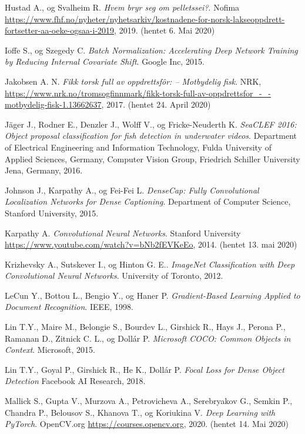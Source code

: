 \documentclass[11ot]{article}
\begin{document}
\begin{thebibliography}{9}
Hustad A., og Svalheim R.
\textit{Hvem bryr seg om pelletssei?}. 
Nofima \url{https://www.fhf.no/nyheter/nyhetsarkiv/kostnadene-for-norsk-lakseoppdrett-fortsetter-aa-oeke-ogsaa-i-2019}, 2019. (hentet 6. Mai 2020)

Ioffe S., og Szegedy C. 
\textit{Batch Normalization: Accelerating Deep Network Training by Reducing Internal Covariate Shift}. 
Google Inc, 2015.

Jakobsen A. N.
\textit{Fikk torsk full av oppdrettsfôr: – Motbydelig fisk}. 
NRK, \url{https://www.nrk.no/tromsogfinnmark/fikk-torsk-full-av-oppdrettsfor_-_-motbydelig-fisk-1.13662637}, 2017. (hentet 24. April 2020)

Jäger J., Rodner E., Denzler J., Wolff V., og Fricke-Neuderth K. 
\textit{SeaCLEF 2016: Object proposal classification for fish detection in underwater videos}. 
Department of Electrical Engineering and Information Technology, Fulda University of Applied Sciences, Germany, Computer Vision Group, Friedrich Schiller University Jena, Germany, 2016.

Johnson J., Karpathy A., og Fei-Fei L. 
\textit{DenseCap: Fully Convolutional Localization Networks for Dense Captioning}. 
Department of Computer Science, Stanford University, 2015.

Karpathy A. 
\textit{Convolutional Neural Networks}. 
Stanford University \url{https://www.youtube.com/watch?v=bNb2fEVKeEo}, 2014. (hentet 13. mai 2020)

Krizhevsky A., Sutskever  I., og Hinton G. E.. 
\textit{ImageNet Classification with Deep Convolutional Neural Networks}. 
University of Toronto, 2012.

LeCun Y., Bottou L., Bengio Y., og Haner P. 
\textit{Gradient-Based Learning Applied to Document Recognition}. 
IEEE, 1998.

Lin T.Y., Maire M., Belongie S., Bourdev L., Girshick R., Hays J., Perona P., Ramanan D., Zitnick C. L., og Dollár P. 
\textit{Microsoft COCO: Common Objects in Context}. 
Microsoft, 2015.

Lin T.Y., Goyal P., Girshick R., He K., Dollár P.
\textit{Focal Loss for Dense Object Detection}
Facebook AI Research, 2018.

Mallick S., Gupta V., Murzova A., Petrovicheva A., Serebryakov G., Semkin P., Chandra P., Belousov S., Khanova T., og Koriukina V.
\textit{Deep Learning with PyTorch}. 
OpenCV.org \url{https://courses.opencv.org}, 2020. (hentet 14. Mai 2020)


\end{thebibliography}
\end{document}
